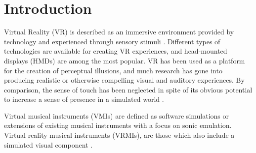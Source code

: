 \documentclass{article}
\title{\papertitle}
\begin{document}
%
\capstartfalse
\maketitle
\capstarttrue
%
\begin{abstract}
This paper presents DigiDrum -- a novel virtual reality musical instrument (VRMI) which consists of a physical drum augmented by virtual reality (VR) to produce enhanced auditory and haptic feedback. The physical drum membrane is driven by a simulated membrane of which the parameters can be changed on the fly. The design and implementation of the instrument setup are detailed together with the preliminary results of a user study which investigates users' haptic perception of the material stiffness of the drum membrane. The study tests whether the tension in the membrane simulation and the sound damping (how fast the sound dies out) changes users' perception of drum membrane stiffness. Preliminary results show that higher values for both tension and damping give the illusion of higher material stiffness in the drum membrane, where the damping appears to be the more important factor. The goal and contribution of this work is twofold: on the one hand it introduces a musical instrument which allows for enhanced musical expression possibilities through VR. On the other hand, it presents an early investigation on how haptics influence users' interaction in VRMIs by presenting a preliminary study.
\end{abstract}
\section{Introduction}\label{sec:introduction}
Virtual Reality (VR) is described as an immersive environment provided by technology and experienced through sensory stimuli \cite{Serafin:2017}. %
%
Different types of technologies are available for creating VR experiences, and head-mounted displays (HMDs) are among the most popular. VR has been used as a platform for the creation of perceptual illusions, and much research has gone into producing realistic or otherwise compelling visual and auditory experiences. By comparison, the sense of touch has been neglected in spite of its obvious potential to increase a sense of presence in a simulated world \cite{Serafin:2017}.

Virtual musical instruments (VMIs) are defined as software simulations or extensions of existing musical instruments with a focus on sonic emulation. Virtual reality musical instruments (VRMIs), are those which also include a simulated visual component \cite{Serafin:2016}. 
\end{document}
